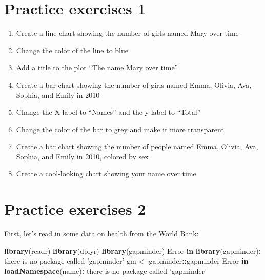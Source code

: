 \documentclass[
]{book}
\newenvironment{Shaded}{\begin{snugshade}}{\end{snugshade}}
\newcommand{\ControlFlowTok}[1]{\textcolor[rgb]{0.13,0.29,0.53}{\textbf{#1}}}
\newcommand{\KeywordTok}[1]{\textcolor[rgb]{0.13,0.29,0.53}{\textbf{#1}}}
\newcommand{\NormalTok}[1]{#1}
\newcommand{\OperatorTok}[1]{\textcolor[rgb]{0.81,0.36,0.00}{\textbf{#1}}}
\newcommand{\StringTok}[1]{\textcolor[rgb]{0.31,0.60,0.02}{#1}}
\begin{document}
\hypertarget{practice-exercises-1}{%
\section*{Practice exercises 1}\label{practice-exercises-1}}

\begin{enumerate}
\def\labelenumi{\arabic{enumi})}
\item
  Create a line chart showing the number of girls named Mary over time
\item
  Change the color of the line to blue
\item
  Add a title to the plot ``The name Mary over time''
\item
  Create a bar chart showing the number of girls named Emma, Olivia, Ava, Sophia, and Emily in 2010
\item
  Change the X label to ``Names'' and the y label to ``Total''
\item
  Change the color of the bar to grey and make it more transparent
\item
  Create a bar chart showing the number of people named Emma, Olivia, Ava, Sophia, and Emily in 2010, colored by sex
\item
  Create a cool-looking chart showing your name over time
\end{enumerate}

\hypertarget{practice-exercises-2}{%
\section*{Practice exercises 2}\label{practice-exercises-2}}

First, let's read in some data on health from the World Bank:

\begin{Shaded}
\begin{Highlighting}[]
\KeywordTok{library}\NormalTok{(readr)}
\KeywordTok{library}\NormalTok{(dplyr)}
\KeywordTok{library}\NormalTok{(gapminder)}
\NormalTok{Error }\ControlFlowTok{in} \KeywordTok{library}\NormalTok{(gapminder)}\OperatorTok{:}\StringTok{ }\NormalTok{there is no package called }\StringTok{'gapminder'}
\NormalTok{gm <-}\StringTok{ }\NormalTok{gapminder}\OperatorTok{::}\NormalTok{gapminder}
\NormalTok{Error }\ControlFlowTok{in} \KeywordTok{loadNamespace}\NormalTok{(name)}\OperatorTok{:}\StringTok{ }\NormalTok{there is no package called }\StringTok{'gapminder'}
\end{Highlighting}
\end{Shaded}
\end{document}
